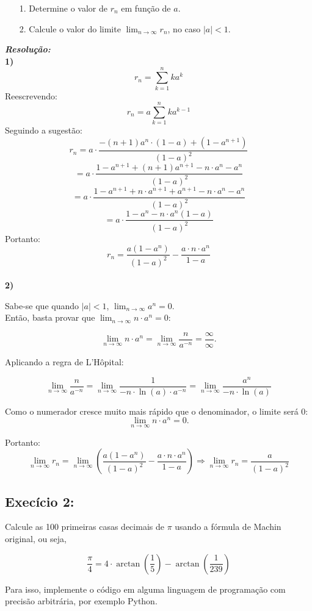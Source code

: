 \documentclass[12pt]{article}
\begin{document}
\begin{enumerate}
    \item[1.] Determine o valor de \( r_n \) em função de \( a \).
    \item[2.] Calcule o valor do limite \( \lim_{n \to \infty} r_n \), no caso \( |a| < 1 \).
\end{enumerate}
\textit{\textbf{Resolução:}}\\
\textbf{1)}
\[
r_n = \sum_{k=1}^{n} k a^k
\]
Reescrevendo:
\[
r_n = a \sum_{k=1}^{n} k a^{k-1}
\]
Seguindo a sugestão:
\[r_n=a\cdot\frac{-(n+1)a^n\cdot(1-a)+(1-a^{n+1})}{(1-a)^2}\]
\[=a\cdot\frac{1-a^{n+1}+(n+1)a^{n+1}-n\cdot a^n-a^n}{(1-a)^2}\]
\[=a\cdot\frac{1-a^{n+1}+n\cdot a^{n+1}+a^{n+1}-n\cdot a^n-a^n}{(1-a)^2}\]
\[=a\cdot\frac{1-a^n-n\cdot a^n(1-a)}{(1-a)^2}\]
Portanto:
\[r_n = \frac{a(1 - a^n)}{(1 - a)^2}-\frac{a\cdot n\cdot a^n}{1-a}\]
\vspace{1cm}\\
\textbf{2)}

Sabe-se que quando \( |a| < 1 \), \(\displaystyle \lim_{n \to \infty}a^n=0\).
\vspace{0.2cm}\\
Então, basta provar que \(\displaystyle \lim_{n \to \infty}n\cdot a^n=0\):

\[
\lim_{n \to \infty} n \cdot a^n = \lim_{n \to \infty} \frac{n}{a^{-n}}=\frac{\infty}{\infty}.
\]

Aplicando a regra de L'Hôpital:

\[\lim_{n\to\infty}\frac{n}{a^{-n}}=\lim_{n\to\infty}\frac{1}{-n\cdot\ln(a)\cdot a^{-n}}=\lim_{n\to\infty}\frac{a^n}{-n\cdot\ln(a)}\]

Como o numerador cresce muito mais rápido que o denominador, o limite será 0:
\[\lim_{n \to \infty} n \cdot a^n = 0.\]

Portanto:
\[\lim_{n\to\infty}r_n=\displaystyle\lim_{n\to\infty}\left(\frac{a(1-a^n)}{(1-a)^2}-\frac{a\cdot n\cdot a^n}{1-a}\right)\Rightarrow\lim_{n\to\infty}r_n=\frac{a}{(1-a)^2}\]

\newpage
\subsection{Execício 2:}
Calcule as 100 primeiras casas decimais de \(\pi\) usando a fórmula de Machin original, ou seja,

\[
\frac{\pi}{4} = 4 \cdot \arctan\left(\frac{1}{5}\right) - \arctan\left(\frac{1}{239}\right)
\]

Para isso, implemente o código em alguma linguagem de programação com precisão arbitrária, por exemplo Python.\\
\end{document}

